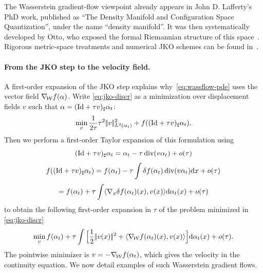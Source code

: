 The Wasserstein gradient-flow viewpoint already appears in John D. Lafferty's PhD work, published as ``The Density Manifold and Configuration Space Quantization'', under the name ``density manifold''. It was then systematically developed by Otto, who exposed the formal Riemannian structure of this space~\cite{otto2001geometry}. Rigorous metric-space treatments and numerical JKO schemes can be found in~\cite{ambrosio2006gradient,JDB-JKO,2015-Peyre-siims,gallouet2017jko}.

\paragraph{From the JKO step to the velocity field.}

A first-order expansion of the JKO step explains why~\eqref{eq:wassflow-pde} uses the vector field $\nabla_{\!\operatorname{\mathcal{W}}} f(\alpha)$. Write \eqref{eq:jko-discr} as a minimization over displacement fields $v$ such that $\alpha = (\mathrm{Id} + \tau v)_\sharp \alpha_t$:
	\[
		\min_{v} \frac{1}{2 \tau} \tau^2 |\!| v |\!|_{L^2(\alpha_t)}^2 + f( (\mathrm{Id} + \tau v)_\sharp \alpha_t ).
	\]
Then we perform a first-order Taylor expansion of this formulation using
	\[
		 (\mathrm{Id} + \tau v)_\sharp \alpha_t =  \alpha_t - \tau \operatorname{div}( v \alpha_t ) + o(\tau)
	\]
	\[
		f( (\mathrm{Id} + \tau v)_\sharp \alpha_t ) = f(\alpha_t) - \tau \int \delta f(\alpha_t) \operatorname{div}( v \alpha_t ) \mathrm{d} x + o(\tau)
	\]
	\[
		 = f(\alpha_t) + \tau \int \langle \nabla_x \delta f(\alpha_t)(x), v(x) \rangle \mathrm{d} \alpha_t(x) + o(\tau)
	\]
to obtain the following first-order expansion in $\tau$ of the problem minimized in \eqref{eq:jko-discr}
	\[
		 \min_{v} f(\alpha_t) +  \tau \int \Big[ \frac{1}{2} |\!| v(x) |\!|^2 + \langle \nabla_{\!\operatorname{\mathcal{W}}} f(\alpha_t)(x), v(x) \rangle \Big]\mathrm{d} \alpha_t(x) + o(\tau).
	\]
The pointwise minimizer is $v=-\nabla_{\!\operatorname{\mathcal{W}}} f(\alpha_t)$, which gives the velocity in the continuity equation.
We now detail examples of such Wasserstein gradient flows.


